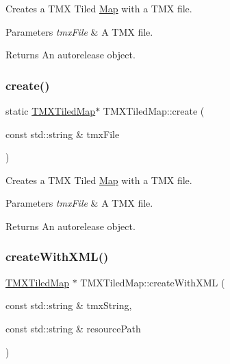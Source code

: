 Creates a T\+MX Tiled \hyperlink{classMap}{Map} with a T\+MX file.


\begin{DoxyParams}{Parameters}
{\em tmx\+File} & A T\+MX file. \\
\hline
\end{DoxyParams}
\begin{DoxyReturn}{Returns}
An autorelease object. 
\end{DoxyReturn}
\mbox{\label{classTMXTiledMap_a8f0787367238690d49a54e5db1dd1294}} 
\subsubsection{\texorpdfstring{create()}{create()}\hspace{0.1cm}{\footnotesize\ttfamily [2/2]}}
{\footnotesize\ttfamily static \hyperlink{classTMXTiledMap}{T\+M\+X\+Tiled\+Map}$\ast$ T\+M\+X\+Tiled\+Map\+::create (\begin{DoxyParamCaption}\item[{const std\+::string \&}]{tmx\+File }\end{DoxyParamCaption})\hspace{0.3cm}{\ttfamily [static]}}

Creates a T\+MX Tiled \hyperlink{classMap}{Map} with a T\+MX file.


\begin{DoxyParams}{Parameters}
{\em tmx\+File} & A T\+MX file. \\
\hline
\end{DoxyParams}
\begin{DoxyReturn}{Returns}
An autorelease object. 
\end{DoxyReturn}
\mbox{\label{classTMXTiledMap_af3a5adeaeec14ab3455494f0c230335b}} 
\subsubsection{\texorpdfstring{create\+With\+X\+M\+L()}{createWithXML()}\hspace{0.1cm}{\footnotesize\ttfamily [1/2]}}
{\footnotesize\ttfamily \hyperlink{classTMXTiledMap}{T\+M\+X\+Tiled\+Map} $\ast$ T\+M\+X\+Tiled\+Map\+::create\+With\+X\+ML (\begin{DoxyParamCaption}\item[{const std\+::string \&}]{tmx\+String,  }\item[{const std\+::string \&}]{resource\+Path }\end{DoxyParamCaption})\hspace{0.3cm}{\ttfamily [static]}}

